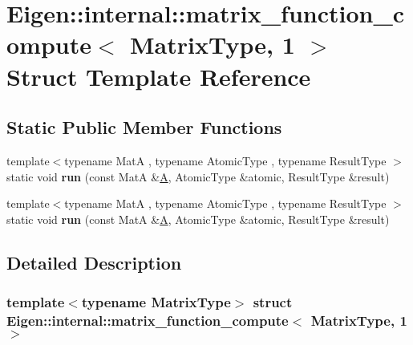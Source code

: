 \hypertarget{struct_eigen_1_1internal_1_1matrix__function__compute_3_01_matrix_type_00_011_01_4}{}\section{Eigen\+:\+:internal\+:\+:matrix\+\_\+function\+\_\+compute$<$ Matrix\+Type, 1 $>$ Struct Template Reference}
\label{struct_eigen_1_1internal_1_1matrix__function__compute_3_01_matrix_type_00_011_01_4}
\subsection*{Static Public Member Functions}
\begin{DoxyCompactItemize}
\item 
\mbox{\label{struct_eigen_1_1internal_1_1matrix__function__compute_3_01_matrix_type_00_011_01_4_ad6c56b11de78e66a39194b001045298a}} 
{\footnotesize template$<$typename MatA , typename Atomic\+Type , typename Result\+Type $>$ }\\static void {\bfseries run} (const MatA \&\hyperlink{group___core___module_class_eigen_1_1_matrix}{A}, Atomic\+Type \&atomic, Result\+Type \&result)
\item 
\mbox{\label{struct_eigen_1_1internal_1_1matrix__function__compute_3_01_matrix_type_00_011_01_4_ad6c56b11de78e66a39194b001045298a}} 
{\footnotesize template$<$typename MatA , typename Atomic\+Type , typename Result\+Type $>$ }\\static void {\bfseries run} (const MatA \&\hyperlink{group___core___module_class_eigen_1_1_matrix}{A}, Atomic\+Type \&atomic, Result\+Type \&result)
\end{DoxyCompactItemize}


\subsection{Detailed Description}
\subsubsection*{template$<$typename Matrix\+Type$>$\newline
struct Eigen\+::internal\+::matrix\+\_\+function\+\_\+compute$<$ Matrix\+Type, 1 $>$}



